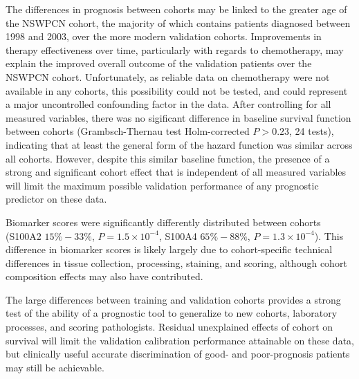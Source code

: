 \documentclass[dissertation.tex]{subfiles}
\begin{document}
The differences in prognosis between cohorts may be linked to the greater age of the \gls{NSWPCN} cohort, the majority of which contains patients diagnosed between 1998 and 2003, over the more modern validation cohorts.  Improvements in therapy effectiveness over time, particularly with regards to chemotherapy, may explain the improved overall outcome of the validation patients over the \gls{NSWPCN} cohort.  Unfortunately, as reliable data on chemotherapy were not available in any cohorts, this possibility could not be tested, and could represent a major uncontrolled confounding factor in the data.  After controlling for all measured variables, there was no sigificant difference in baseline survival function between cohorts (Grambsch-Thernau test \cite{Grambsch1994} Holm-corrected $P > 0.23$, 24 tests), indicating that at least the general form of the hazard function was similar across all cohorts.  However, despite this similar baseline function, the presence of a strong and significant cohort effect that is independent of all measured variables will limit the maximum possible validation performance of any prognostic predictor on these data.

Biomarker scores were significantly differently distributed between cohorts (S100A2 $15\%-33\%$, $P = 1.5 \times 10^{-4}$, S100A4 $65\%-88\%$, $P = 1.3 \times 10^{-4}$).  This difference in biomarker scores is likely largely due to cohort-specific technical differences in tissue collection, processing, staining, and scoring, although cohort composition effects may also have contributed.

The large differences between training and validation cohorts provides a strong test of the ability of a prognostic tool to generalize to new cohorts, laboratory processes, and scoring pathologists.  Residual unexplained effects of cohort on survival will limit the validation calibration performance attainable on these data, but clinically useful accurate discrimination of good- and poor-prognosis patients may still be achievable.
\end{document}
